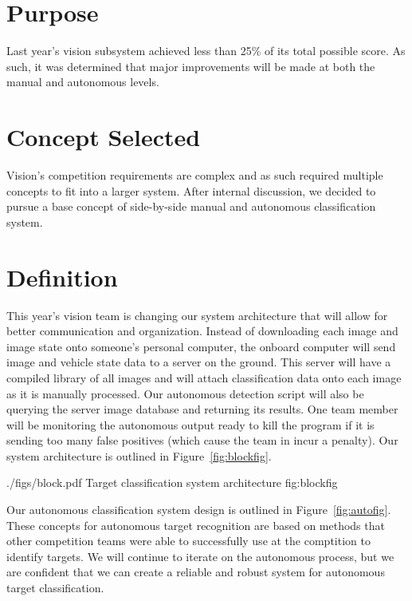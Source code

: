 \documentclass[]{auvsi_doc}
\begin{document}
\begin{AUVSITitlePage}
\begin{artifacttable}
\end{artifacttable}
\end{AUVSITitlePage}

\section{Purpose}

Last year's vision subsystem achieved less than 25\% of its total possible score. As such, 
it was determined that major improvements will be made at both the manual and autonomous 
levels.

\section{Concept Selected}

Vision's competition requirements are complex and as such required multiple concepts to 
fit into a larger system. After internal discussion, we decided to pursue a base concept 
of side-by-side manual and autonomous classification system.

\section{Definition}

This year's vision team is changing our system architecture that will allow for better
communication and organization. Instead of downloading each image and image state
onto someone's personal computer, the onboard computer will send image and vehicle state
data to a server on the ground. This server will have a compiled library of all images
and will attach classification data onto each image as it is manually processed. Our 
autonomous detection script will also be querying the server image database and returning
its results. One team member will be monitoring the autonomous output ready to kill the 
program if it is sending too many false positives (which cause the team in incur a 
penalty). Our system architecture is outlined in Figure~\ref{fig:blockfig}.

\AUVSIFigure
{./figs/block.pdf}
{\textwidth}
{Target classification system architecture}
{fig:blockfig}

Our autonomous classification system design is outlined in Figure~\ref{fig:autofig}.
These concepts for autonomous target recognition are based on methods that
other competition teams were able to successfully use at the comptition to
identify targets. We will continue to iterate on the autonomous process, but
we are confident that we can create a reliable and robust system for autonomous
target classification.
\end{document}
